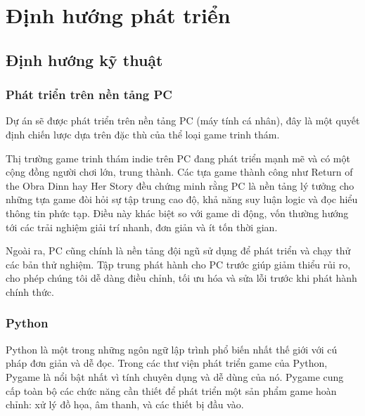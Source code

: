 \section{Định hướng phát triển}
\subsection{Định hướng kỹ thuật}

\subsubsection{Phát triển trên nền tảng PC} 
Dự án sẽ được phát triển trên nền tảng PC (máy tính cá nhân), đây là một quyết định chiến lược dựa trên đặc thù của thể loại game trinh thám. 

Thị trường game trinh thám indie trên PC đang phát triển mạnh mẽ và có một cộng đồng người chơi lớn, trung thành. Các tựa game thành công như Return of the Obra Dinn hay Her Story đều chứng minh rằng PC là nền tảng lý tưởng cho những tựa game đòi hỏi sự tập trung cao độ, khả năng suy luận logic và đọc hiểu thông tin phức tạp. Điều này khác biệt so với game di động, vốn thường hướng tới các trải nghiệm giải trí nhanh, đơn giản và ít tốn thời gian.

Ngoài ra, PC cũng chính là nền tảng đội ngũ sử dụng để phát triển và chạy thử các bản thử nghiệm. Tập trung phát hành cho PC trước giúp giảm thiểu rủi ro, cho phép chúng tôi dễ dàng điều chỉnh, tối ưu hóa và sửa lỗi trước khi phát hành chính thức.

\subsubsection{Python}
Python là một trong những ngôn ngữ lập trình phổ biến nhất thế giới với cú pháp đơn giản và dễ đọc. Trong các thư viện phát triển game của Python, Pygame là nổi bật nhất vì tính chuyên dụng và dễ dùng của nó. Pygame cung cấp toàn bộ các chức năng cần thiết để phát triển một sản phẩm game hoàn chỉnh: xử lý đồ họa, âm thanh, và các thiết bị đầu vào.

